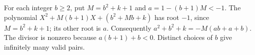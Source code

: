 For each integer $b\ge2$, put $M=b^2+k+1$ and $a=1-(b+1)M<-1$. The polynomial $X^2+M(b+1)X+(b^2+Mb+k)$ has root $-1$, since $M=b^2+k+1$; its other root is $a$. Consequently $a^2+b^2+k=-M(ab+a+b)$. The divisor is nonzero because $a(b+1)+b<0$. Distinct choices of $b$ give infinitely many valid pairs.
